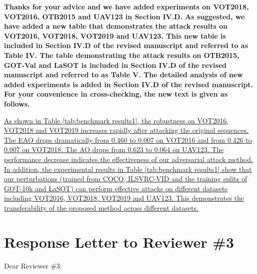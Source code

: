 \documentclass[12pt]{article}
\begin{document}
\textbf{Thanks for your advice and we have added experiments on VOT2018, VOT2016, OTB2015 and UAV123 in Section IV.D.
As suggested, we have added a new table that demonstrates the attack results on VOT2016, VOT2018, VOT2019 and UAV123. This new table is included in Section IV.D of the revised manuscript and referred to as Table IV. The table demonstrating the attack results on OTB2015, GOT-Val and LaSOT is included in Section IV.D of the revised manuscript and referred to as Table V.
The detailed analysis of new added experiments is added in Section IV.D of the revised manuscript. For your convenience in cross-checking, the new text is given as follows.}

\uline{As shown in Table \ref{tab:benchmark results1}, the robustness on VOT2016, VOT2018 and VOT2019 increases rapidly after attacking the original sequences. The EAO drops dramatically from 0.460 to 0.007 on VOT2016 and from 0.426 to 0.007 on VOT2018. The AO drops from 0.623 to 0.064 on UAV123. The performance decrease indicates the effectiveness of our adversarial attack method.
In addition, the experimental results in Table \ref{tab:benchmark results1} show that our perturbations (trained from COCO, ILSVRC-VID and the training splits of GOT-10k and LaSOT) can perform effective attacks on different datasets including VOT2016, VOT2018, VOT2019 and UAV123. This demonstrates the transferability of the proposed method across different datasets.
}

\clearpage
\newpage
{\centering\section*{Response Letter to Reviewer \#3}}
\noindent Dear Reviewer \#3:
\end{document}
